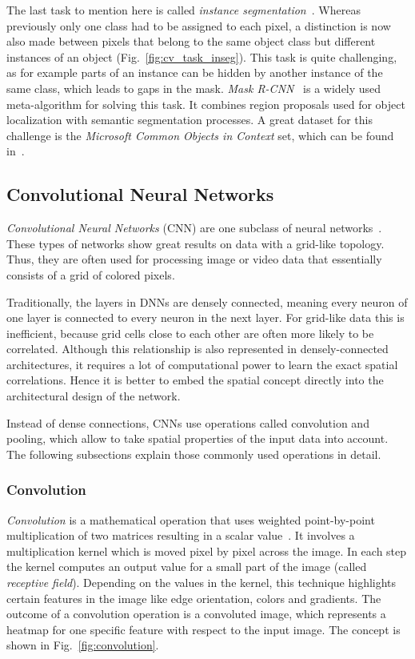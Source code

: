 The last task to mention here is called \emph{instance segmentation}~\cite{mask-rcnn14}. Whereas previously only one class had to be assigned to each pixel, a distinction is now also made between pixels that belong to the same object class but different instances of an object (Fig.~\ref{fig:cv_task_inseg}). This task is quite challenging, as for example parts of an instance can be hidden by another instance of the same class, which leads to gaps in the mask. \emph{Mask R-CNN}~\cite{mask-rcnn14} is a widely used meta-algorithm for solving this task. It combines region proposals used for object localization with semantic segmentation processes. A great dataset for this challenge is the \emph{Microsoft Common Objects in Context} set, which can be found in~\cite{coco14}.

\subsection{Convolutional Neural Networks}
\label{sec:cnn}
\emph{Convolutional Neural Networks} (CNN) are one subclass of neural networks~\cite[p.~359]{praxiseinstieg_ml17}. These types of networks show great results on data with a grid-like topology. Thus, they are often used for processing image or video data that essentially consists of a grid of colored pixels.

Traditionally, the layers in DNNs are densely connected, meaning every neuron of one layer is connected to every neuron in the next layer. For grid-like data this is inefficient, because grid cells close to each other are often more likely to be correlated. Although this relationship is also represented in densely-connected architectures, it requires a lot of computational power to learn the exact spatial correlations. Hence it is better to embed the spatial concept directly into the architectural design of the network.

Instead of dense connections, CNNs use operations called convolution and pooling, which allow to take spatial properties of the input data into account. The following subsections explain those commonly used operations in detail.

\subsubsection{Convolution}
\label{sec:convolution}
\emph{Convolution} is a mathematical operation that uses weighted point-by-point multiplication of two matrices resulting in a scalar value~\cite[p.~361 f]{praxiseinstieg_ml17}. It involves a multiplication kernel which is moved pixel by pixel across the image. In each step the kernel computes an output value for a small part of the image (called \emph{receptive field}). Depending on the values in the kernel, this technique highlights certain features in the image like edge orientation, colors and gradients. The outcome of a convolution operation is a convoluted image, which represents a heatmap for one specific feature with respect to the input image. The concept is shown in Fig.~\ref{fig:convolution}.

